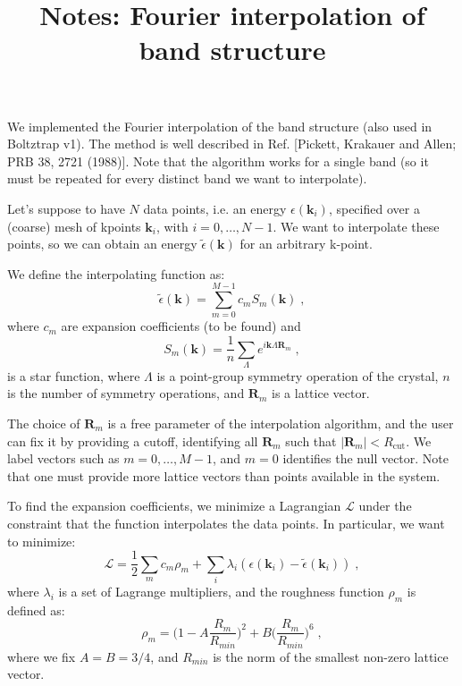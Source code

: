 \documentclass[singlecolumn,english,aps,prl,showpacs,floatfix,superscriptaddress,notitlepage]{revtex4-1}
\begin{document}
\title{Notes: Fourier interpolation of band structure}

\maketitle

We implemented the Fourier interpolation of the band structure (also used in Boltztrap v1).  
The method is well described in Ref. [Pickett, Krakauer and Allen; PRB 38, 2721 (1988)].
Note that the algorithm works for a single band (so it must be repeated for every distinct band we want to interpolate).

Let's suppose to have $N$ data points, i.e. an energy $\epsilon(\boldsymbol{k}_i)$, specified over a (coarse) mesh of kpoints $\boldsymbol{k}_i$, with $i=0,\dots,N-1$.
We want to interpolate these points, so we can obtain an energy $\tilde{\epsilon}(\boldsymbol{k})$ for an arbitrary k-point.

We define the interpolating function as:
\begin{equation}
\tilde{\epsilon}(\boldsymbol{k}) = \sum_{m=0}^{M-1} c_m S_m(\boldsymbol{k}) \;,
\end{equation}
where $c_m$ are expansion coefficients (to be found) and
\begin{equation}
S_m(\boldsymbol{k}) = \frac{1}{n} \sum_{\Lambda} e^{i\boldsymbol{k} \Lambda \boldsymbol{R}_m} \;,
\end{equation}
is a star function, where $\Lambda$ is a point-group symmetry operation of the crystal, $n$ is the number of symmetry operations, and $\boldsymbol{R}_m$ is a lattice vector.

The choice of $\boldsymbol{R}_m$ is a free parameter of the interpolation algorithm, and the user can fix it by providing a cutoff, identifying all $\boldsymbol{R}_m$ such that $|\boldsymbol{R}_m | < R_{\text{cut}}$.
We label vectors such as $m=0,\dots,M-1$, and $m=0$ identifies the null vector.
Note that one must provide more lattice vectors than points available in the system.

To find the expansion coefficients, we minimize a Lagrangian $\mathcal{L}$ under the constraint that the function interpolates the data points.
In particular, we want to minimize:
\begin{equation}
\mathcal{L} = \frac{1}{2} \sum_m c_m \rho_m + \sum_i \lambda_i (\epsilon(\boldsymbol{k}_i)-\tilde{\epsilon}(\boldsymbol{k}_i)) \;,
\end{equation}
where $\lambda_i$ is a set of Lagrange multipliers, and the roughness function $\rho_m$ is defined as:
\begin{equation}
\rho_m = \bigg(1-A\frac{R_m}{R_{min}}\bigg)^2 + B\bigg(\frac{R_m}{R_{min}}\bigg)^6  \;,
\end{equation}
where we fix $A=B=3/4$, and $R_{min}$ is the norm of the smallest non-zero lattice vector.
\end{document}
